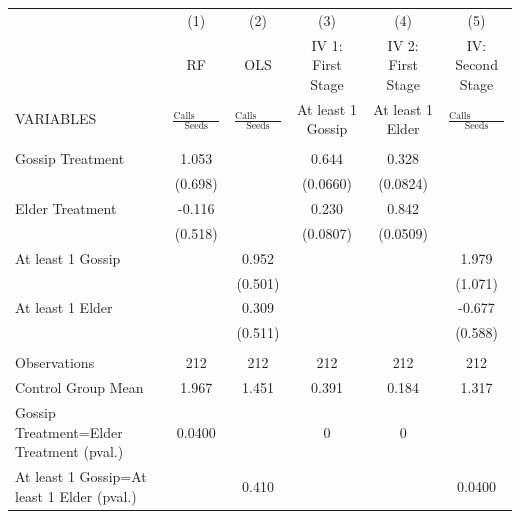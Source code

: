 \begin{tabular}{lccccc} \hline
 & (1) & (2) & (3) & (4) & (5) \\
 & RF & OLS & IV 1: First Stage & IV 2: First Stage & IV: Second Stage \\
VARIABLES & $\frac{\mbox{Calls Received}}{\mbox{Seeds}}$ & $\frac{\mbox{Calls Received}}{\mbox{Seeds}}$ & At least 1 Gossip & At least 1 Elder & $\frac{\mbox{Calls Received}}{\mbox{Seeds}}$ \\ \hline
 &  &  &  &  &  \\
Gossip Treatment & 1.053 &  & 0.644 & 0.328 &  \\
 & (0.698) &  & (0.0660) & (0.0824) &  \\
Elder Treatment & -0.116 &  & 0.230 & 0.842 &  \\
 & (0.518) &  & (0.0807) & (0.0509) &  \\
At least 1 Gossip &  & 0.952 &  &  & 1.979 \\
 &  & (0.501) &  &  & (1.071) \\
At least 1 Elder &  & 0.309 &  &  & -0.677 \\
 &  & (0.511) &  &  & (0.588) \\
 &  &  &  &  &  \\
Observations & 212 & 212 & 212 & 212 & 212 \\
Control Group Mean & 1.967 & 1.451 & 0.391 & 0.184 & 1.317 \\
Gossip Treatment=Elder Treatment (pval.) & 0.0400 &  & 0 & 0 &  \\
 At least 1 Gossip=At least 1 Elder (pval.) &  & 0.410 &  &  & 0.0400 \\ \hline
\end{tabular}
